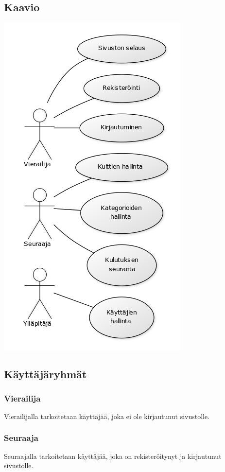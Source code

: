 \documentclass[a4paper]{article}
\begin{document}
	\subsection{Kaavio}
	\begin{center}
		\includegraphics[scale=0.8]{kayttotapauskaavio}
	\end{center}
	
	\subsection{Käyttäjäryhmät}
	\subsubsection{Vierailija}
	Vierailijalla tarkoitetaan käyttäjää, joka ei ole kirjautunut sivustolle.
	
	\subsubsection{Seuraaja}
	Seuraajalla tarkoitetaan käyttäjää, joka on rekisteröitynyt ja kirjautunut sivustolle.
	
\end{document}
